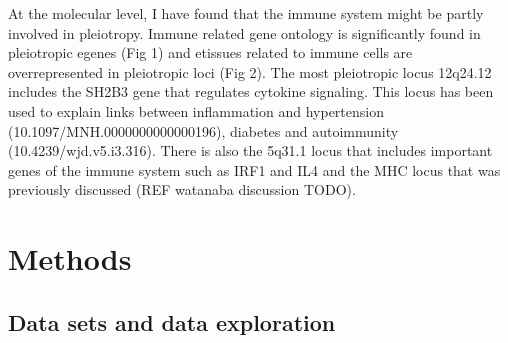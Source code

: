 At the molecular level, I have found that the immune system might be partly involved in pleiotropy.
%
Immune related gene ontology is significantly found in pleiotropic egenes (Fig 1) and etissues related to immune cells are overrepresented in pleiotropic loci (Fig 2).
%
The most pleiotropic locus 12q24.12 includes the SH2B3 gene that regulates cytokine signaling.
%
This locus has been used to explain links between inflammation and hypertension (10.1097/MNH.0000000000000196), diabetes and autoimmunity (10.4239/wjd.v5.i3.316).
%
There is also the 5q31.1 locus that includes important genes of the immune system such as IRF1 and IL4 and the MHC locus that was previously discussed (REF watanaba discussion TODO).



%
%
%
%

\section*{Methods}\label{sec:methods}

\subsection*{Data sets and data exploration}

